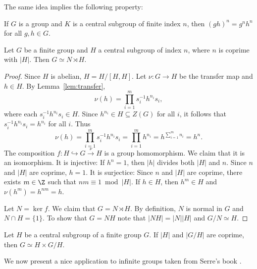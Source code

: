 The same idea implies the following property:

\begin{exercise}
\label{xca:K_central}
	If $G$ is a group and $K$ is a central subgroup of finite index $n$, then
	$(gh)^n=g^nh^n$ for all $g,h\in G$.	
\end{exercise}

\begin{proposition}
	\label{prop:semidirecto}
	Let $G$ be a finite group and $H$ a central subgroup of index $n$, where 
	$n$ is coprime with $|H|$. Then
	$G\simeq N\rtimes H$.
\end{proposition}

\begin{proof}
	Since $H$ is abelian, $H=H/[H,H]$. Let  
	$\nu\colon G\to H$ be the transfer map and $h\in H$. 
	By Lemma~\ref{lem:transfer}, 
	\[
		\nu(h)
		=\prod_{i=1}^m s_i^{-1}h^{n_i}s_i,
	\]
	where each $s_i^{-1}h^{n_i}s_i\in H$. Since 
	$h^{n_i}\in H\subseteq Z(G)$ for all $i$, it follows that 
	$s_i^{-1}h^{n_i}s_i=h^{n_i}$ for all $i$. Thus 
	\[
		\nu(h)
		=\prod_{i=1}^m s_i^{-1}h^{n_i}s_i
		=\prod_{i=1}^mh^{n_i}
		=h^{\sum_{i=1}^m n_i}=h^n.
	\] 
	The composition $f\colon H\hookrightarrow G\xrightarrow{\nu} H$ is a group homomorphism. 
	We claim that it is an isomorphism. It is injective: If $h^n=1$, then 
	$|h|$ divides both $|H|$ and $n$. Since $n$ and $|H|$ are
	coprime, $h=1$. It is surjectice: Since $n$ and $|H|$ are coprime, there exists 
	$m\in\Z$ such that $nm\equiv 1\bmod |H|$. If $h\in H$, then $h^m\in
	H$ and $\nu(h^m)=h^{nm}=h$. 
	
	Let $N=\ker f$. We claim that $G=N\rtimes H$. 
	By definition, $N$ is normal in $G$ and $N\cap
	H=\{1\}$. To show that $G=NH$ note that 
	$|NH|=|N||H|$ and $G/N\simeq H$.
\end{proof}

\begin{exercise}
	Let $H$ be a central subgroup of a finite group $G$. If $|H|$
	and $|G/H|$ are coprime, then $G\simeq H\times G/H$.
\end{exercise}



We now present a nice 
application to infinite groups taken from Serre's book 
\cite[7.12]{MR3469786}. 

